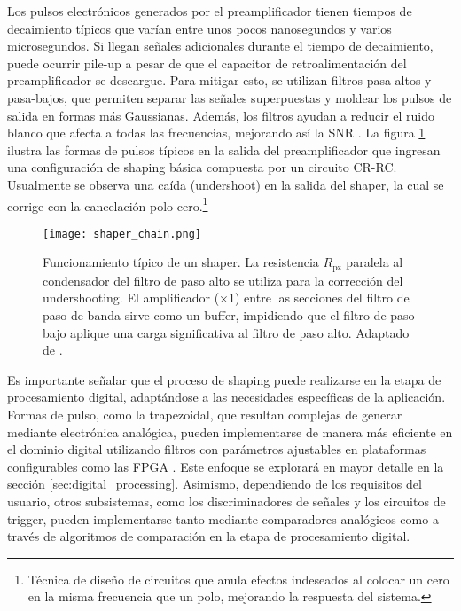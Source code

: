\documentclass{report}
\begin{document}
\noindent Los pulsos electrónicos generados por el preamplificador tienen tiempos de decaimiento típicos que varían entre unos pocos nanosegundos y varios microsegundos. Si llegan señales adicionales durante el tiempo de decaimiento, puede ocurrir pile-up a pesar de que el capacitor de retroalimentación del preamplificador se descargue. Para mitigar esto, se utilizan filtros pasa-altos y pasa-bajos, que permiten separar las señales superpuestas y moldear los pulsos de salida en formas más Gaussianas. Además, los filtros ayudan a reducir el ruido blanco que afecta a todas las frecuencias, mejorando así la SNR \cite{kolanoski5}. La figura \ref{fig:shaper} ilustra las formas de pulsos típicos en la salida del preamplificador que ingresan una configuración de shaping básica compuesta por un circuito CR-RC. Usualmente se observa una caída (undershoot) en la salida del shaper, la cual se corrige con la cancelación polo-cero.\footnote{Técnica de diseño de circuitos que anula efectos indeseados al colocar un cero en la misma frecuencia que un polo, mejorando la respuesta del sistema.} \\

\begin{figure}[h]
    \centering
    \texttt{[image: shaper\_chain.png]}
    \caption{Funcionamiento típico de un shaper. La resistencia $R_{\text{pz}}$ paralela al condensador del filtro de paso alto se utiliza para la corrección del undershooting. El amplificador (×1) entre las secciones del filtro de paso de banda sirve como un buffer, impidiendo que el filtro de paso bajo aplique una carga significativa al filtro de paso alto. Adaptado de \cite{kolanoski5}.}
    \label{fig:shaper}
\end{figure}

\noindent Es importante señalar que el proceso de shaping puede realizarse en la etapa de procesamiento digital, adaptándose a las necesidades específicas de la aplicación. Formas de pulso, como la trapezoidal, que resultan complejas de generar mediante electrónica analógica, pueden implementarse de manera más eficiente en el dominio digital utilizando filtros con parámetros ajustables en plataformas configurables como las FPGA \cite{radeka1968optimum}. Este enfoque se explorará en mayor detalle en la sección \ref{sec:digital_processing}. Asimismo, dependiendo de los requisitos del usuario, otros subsistemas, como los discriminadores de señales y los circuitos de trigger, pueden implementarse tanto mediante comparadores analógicos como a través de algoritmos de comparación en la etapa de procesamiento digital.
\end{document}
